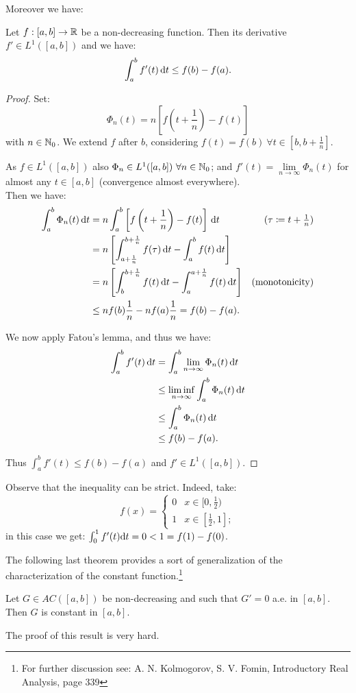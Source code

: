 Moreover we have:
\begin{prop}\label{prop-nondecreasing-inequality}
	Let $f: [a,b]\to \mathbb R$ be a non-decreasing function. Then its derivative $f' \in L^1([a,b])$ and we have:
	$$\int_a^b f'(t) \,\mathrm d t \leq f(b)- f(a).$$
\end{prop}
\begin{proof}
	Set:
	$$\Phi_n(t) = n \left[ f\left( t + \frac 1 n \right)-f(t) \right]$$
	with $n \in \mathbb N_0$. We extend $f$ after $b$, considering $f(t)=f(b) \ \forall t \in [b,b+\frac 1 n]$.
	
	As $f\in L^1([a,b])$ also $\Phi_n \in L^1([a,b]) \ \forall n \in \mathbb N_0$; and $f'(t) = \lim\limits_{n \to \infty}\Phi_n(t)$ for almost any $t \in [a,b]$ (convergence almost everywhere).\\
	Then we have:
	\begin{align*}
	\int_a^b \Phi_n (t) \,\mathrm d t
	&= n \int_a^b \left[ f\left( t + \frac 1 n \right)-f(t) \right] \,\mathrm d t
	&(\tau \coloneqq t+ \tfrac 1 n) \\
	&= n\left[\int_{a+\frac 1 n}^{b + \frac 1 n} f(\tau) \,\mathrm d t - \int_a^b f(t) \,\mathrm d t\right] \\
	&= n\left[\int_{b}^{b + \frac 1 n} f(t) \,\mathrm d t - \int_a^{a+\frac 1 n} f(t) \,\mathrm d t\right]
	&\text{(monotonicity)} \\
	&\le n f(b) \frac 1 n - n f(a) \frac 1 n
	= f(b) - f(a).
	\end{align*}
	
	We now apply Fatou's lemma, and thus we have:
	\begin{align*}
	\int_a^b f'(t) \,\mathrm d t
	&= \int_a^b \lim_{n \to \infty}\Phi_n(t) \,\mathrm d t\\
	&\leq \liminf_{n \to \infty} \int_a^b \Phi_n(t) \,\mathrm d t \\
	&\leq \int_a^b \Phi_n(t) \,\mathrm d t\\
	&\leq f(b) - f(a).
	\end{align*}
	
	Thus $\int_a^b f'(t) \leq f(b)- f(a)$ and $f' \in L^1([a,b])$.
\end{proof}

Observe that the inequality can be strict. Indeed, take:
$$f(x) = \begin{cases}
0 & x\in[0,\frac 1 2) \\
1 & x \in [\frac 1 2, 1];
\end{cases}$$
in this case we get: $\int_0^1 f'(t)\mathrm d t = 0 < 1 = f(1) - f(0)$.

The following last theorem provides a sort of generalization of the characterization of the constant function.\footnote{For further discussion see: A. N. Kolmogorov, S. V. Fomin, Introductory Real Analysis, page 339}
\begin{theo} \label{theo-deriv-zero-non-decr-constant}
	Let $G\in AC([a,b])$ be non-decreasing and such that $G'=0$ a.e. in $[a,b]$. \\
	Then $G$ is constant in $[a,b]$.
\end{theo}
The proof of this result is very hard.

